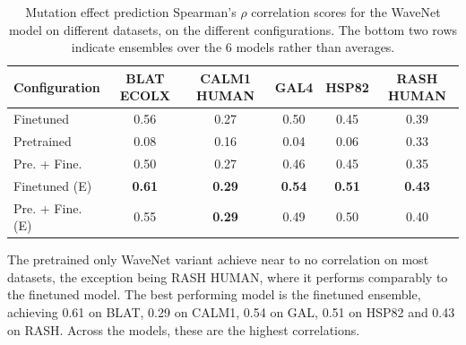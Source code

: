 

\begin{table}[ht]
    \centering
    \begin{tabularx}{\textwidth}{lccccc}
    \hline
    \textbf{Configuration} & \textbf{BLAT ECOLX} & \textbf{CALM1 HUMAN} & \textbf{GAL4} & \textbf{HSP82} & \textbf{RASH HUMAN} \\ \hline
    Finetuned              & 0.56                & 0.27                 & 0.50          & 0.45           & 0.39 \\
    Pretrained             & 0.08                & 0.16                 & 0.04          & 0.06           & 0.33 \\
    Pre. + Fine.           & 0.50                & 0.27                 & 0.46          & 0.45           & 0.35 \\
    \hline
    Finetuned (E)          & \textbf{0.61}       & \textbf{0.29}        & \textbf{0.54} & \textbf{0.51}  & \textbf{0.43} \\
    Pre. + Fine. (E)       & 0.55                & \textbf{0.29}        & 0.49          & 0.50           & 0.40 \\
    \hline
    \end{tabularx}
    \caption{Mutation effect prediction Spearman's $\rho$ correlation scores for the WaveNet model on different datasets, on the different configurations. The bottom two rows indicate ensembles over the 6 models rather than averages.}
    \label{tab:wavenet_rho_results}
\end{table}
The pretrained only WaveNet variant achieve near to no correlation on most datasets, the exception being RASH HUMAN, where it performs comparably to the finetuned model. The best performing model is the finetuned ensemble, achieving 0.61 on BLAT, 0.29 on CALM1, 0.54 on GAL, 0.51 on HSP82 and 0.43 on RASH. Across the models, these are the highest correlations.

